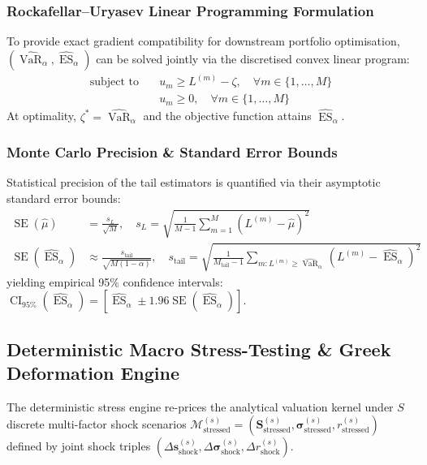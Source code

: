 \documentclass{article}
\theoremstyle{plain}
\theoremstyle{definition}
\theoremstyle{remark}
\DeclareMathOperator{\VaR}{VaR}
\DeclareMathOperator{\ES}{ES}
\begin{document}
\subsubsection{Rockafellar--Uryasev Linear Programming Formulation}
To provide exact gradient compatibility for downstream portfolio optimisation, $(\widehat{\VaR}_\alpha, \widehat{\ES}_\alpha)$ can be solved jointly via the discretised convex linear program:
\begin{align}
    \text{subject to} \quad & u_m \ge L^{(m)} - \zeta, \quad \forall m \in \{1, \dots, M\} \\
    & u_m \ge 0, \quad \forall m \in \{1, \dots, M\}
\end{align}
At optimality, $\zeta^* = \widehat{\VaR}_\alpha$ and the objective function attains $\widehat{\ES}_\alpha$.

\subsubsection{Monte Carlo Precision \& Standard Error Bounds}
Statistical precision of the tail estimators is quantified via their asymptotic standard error bounds:
\begin{align}
    \operatorname{SE}(\hat{\mu}) &= \frac{s_L}{\sqrt{M}}, \quad s_L = \sqrt{\frac{1}{M-1}\sum_{m=1}^M \left(L^{(m)} - \hat{\mu}\right)^2} \\
    \operatorname{SE}(\widehat{\ES}_\alpha) &\approx \frac{s_{\text{tail}}}{\sqrt{M(1 - \alpha)}}, \quad s_{\text{tail}} = \sqrt{\frac{1}{M_{\text{tail}}-1}\sum_{m: L^{(m)} \ge \widehat{\VaR}_\alpha} \left(L^{(m)} - \widehat{\ES}_\alpha\right)^2}
\end{align}
yielding empirical 95\% confidence intervals: $\operatorname{CI}_{95\%}(\widehat{\ES}_\alpha) = \left[ \widehat{\ES}_\alpha \pm 1.96 \operatorname{SE}(\widehat{\ES}_\alpha) \right]$.

\subsection{Deterministic Macro Stress-Testing \& Greek Deformation Engine}
The deterministic stress engine re-prices the analytical valuation kernel under $S$ discrete multi-factor shock scenarios $\mathcal{M}_{\text{stressed}}^{(s)} = (\mathbf{S}_{\text{stressed}}^{(s)}, \boldsymbol{\sigma}_{\text{stressed}}^{(s)}, r_{\text{stressed}}^{(s)})$ defined by joint shock triples $(\Delta \mathbf{s}_{\text{shock}}^{(s)}, \Delta \boldsymbol{\sigma}_{\text{shock}}^{(s)}, \Delta r_{\text{shock}}^{(s)})$.
\end{document}
